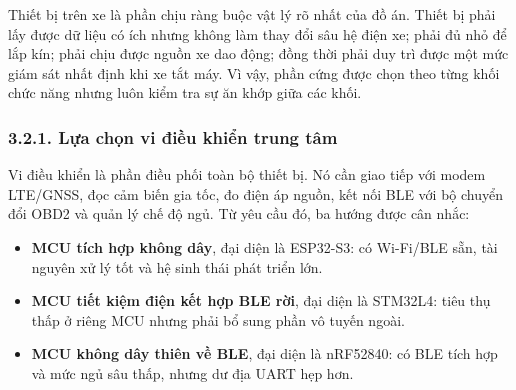 \documentclass[a4paper]{extarticle}
\providecommand{\tightlist}{%
  \setlength{\itemsep}{0pt}\setlength{\parskip}{0pt}}
\begin{document}
Thiết bị trên xe là phần chịu ràng buộc vật lý rõ nhất của đồ án. Thiết bị phải lấy được dữ liệu có ích nhưng không làm thay đổi sâu hệ điện xe; phải đủ nhỏ để lắp kín; phải chịu được nguồn xe dao động; đồng thời phải duy trì được một mức giám sát nhất định khi xe tắt máy. Vì vậy, phần cứng được chọn theo từng khối chức năng nhưng luôn kiểm tra sự ăn khớp giữa các khối.

\subsubsection{3.2.1. Lựa chọn vi điều khiển trung tâm}\label{lux1ef1a-chux1ecdn-vi-ux111iux1ec1u-khiux1ec3n-trung-tuxe2m}

Vi điều khiển là phần điều phối toàn bộ thiết bị. Nó cần giao tiếp với modem LTE/GNSS, đọc cảm biến gia tốc, đo điện áp nguồn, kết nối BLE với bộ chuyển đổi OBD2 và quản lý chế độ ngủ. Từ yêu cầu đó, ba hướng được cân nhắc:

\begin{itemize}
\tightlist
\item
  \textbf{MCU tích hợp không dây}, đại diện là ESP32-S3: có Wi-Fi/BLE sẵn, tài nguyên xử lý tốt và hệ sinh thái phát triển lớn.
\item
  \textbf{MCU tiết kiệm điện kết hợp BLE rời}, đại diện là STM32L4: tiêu thụ thấp ở riêng MCU nhưng phải bổ sung phần vô tuyến ngoài.
\item
  \textbf{MCU không dây thiên về BLE}, đại diện là nRF52840: có BLE tích hợp và mức ngủ sâu thấp, nhưng dư địa UART hẹp hơn.
\end{itemize}
\end{document}
